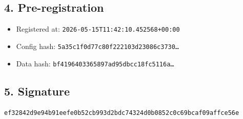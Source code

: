 \documentclass{article}
\begin{document}
\subsection*{4. Pre-registration}
\begin{itemize}
\item Registered at: \texttt{2026-05-15T11:42:10.452568+00:00}
\item Config hash: \texttt{5a35c1f0d77c80f222103d23086c3730\dots}
\item Data hash: \texttt{bf4196403365897ad95dbcc18fc5116a\dots}
\end{itemize}
\subsection*{5. Signature}
\texttt{ef32842d9e94b91eefe0b52cb993d2bdc74324d0b0852c0c69bcaf09affce56e}\\
\end{document}
